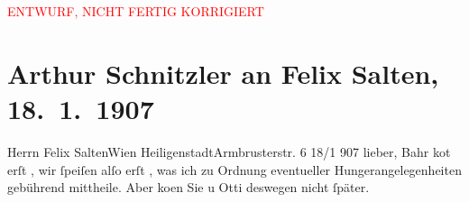 
\begin{center}
            \textcolor{red}{ENTWURF, NICHT FERTIG KORRIGIERT}
                      \end{center}
            
         
         \newcommand{\erwaehntePersonen}{Personen: Hermann Bahr, Gustav Kadelburg, Felix Salten, Ottilie Salten, Richard Skowronnek}
         \newcommand{\erwaehnteOrte}{Orte: Armbrustergasse, Heiligenstadt, Wien, Österreich}
         \newcommand{\erwaehnteWerke}{Werke: Burgtheater »Husarenfieber.« Schwank in vier Akten von Gustav Kadelburg und Richard Skowronnek. – Zum erstenmal: am 17. Januar 1907, Die Zeit, Husarenfieber}
               \section[Arthur Schnitzler an Felix Salten, 18. 1. 1907]{ Arthur Schnitzler an Felix Salten, 18. 1. 1907}\nopagebreak{}\rehead{ }\begin{ledgroupsized}[t]{13cm}\normalsize\beginnumbering \toendnotes[C]{\smallbreak\pagebreak[2]} 
\toendnotes[C]{\smallbreak}\pstart{}{\pb}Herrn Felix Salten\pend{}\pstart{}Wien Heiligenstadt\pend{}\pstart{}Armbrusterstr. 6\pend{}{\bigskip}\pstart
           \raggedleft{}{\pb}18/1 907\pend
           \pstart
           lieber, Bahr ko{\geminationm}t erſt
                  \label{K_L03007-2v}\label{K_L03007-2h}, wir ſpeiſen alſo erſt \label{K_L03007-3v}\label{K_L03007-3h}, was ich zu Ordnung eventueller
               Hungerangelegenheiten gebührend mittheile. Aber ko{\geminationm}en
               Sie u Otti deswegen nicht ſpäter. \pend

\end{ledgroupsized}
